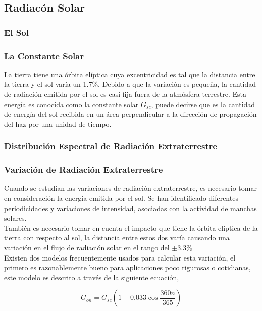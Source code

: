 \subsection{Radiacón Solar}

\subsubsection{El Sol}

\subsubsection{La Constante Solar}
La tierra tiene una órbita elíptica cuya excentricidad es tal que la distancia entre la tierra y el sol varía un 1.7\%. Debido a que la variación es pequeña, la cantidad de radiación emitida por el sol es casi fija fuera de la atmósfera terrestre. Esta energía es conocida como la constante solar $G_{sc}$, puede decirse que es la cantidad de energía del sol recibida en un área perpendicular a la dirección de propagación del haz por una unidad de tiempo.

\subsubsection{Distribución Espectral de Radiación Extraterrestre}

\subsubsection{Variación de Radiación Extraterrestre}
Cuando se estudian las variaciones de radiación extraterrestre, es necesario tomar en consideración la energía emitida por el sol. Se han identificado diferentes periodicidades y variaciones de intensidad, asociadas con la actividad de manchas solares. \\

También es necesario tomar en cuenta el impacto que tiene la órbita elíptica de la tierra con respecto al sol, la distancia entre estos dos varía causando una variación en el flujo de radiación solar en el rango del $\pm3.3\%$ \\

Existen dos modelos frecuentemente usados para calcular esta variación, el primero es razonablemente bueno para aplicaciones poco rigurosas o cotidianas, este modelo es descrito a través de la siguiente ecuación,

\begin{equation}
		G_{on} = G_{sc}\left(1 + 0.033 \cos \frac{360n}{365}\right) 
\end{equation}

